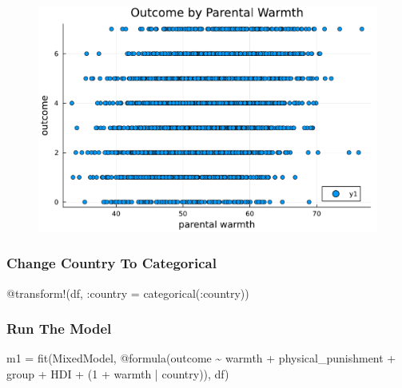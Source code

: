 \documentclass[
  letterpaper,
  DIV=11,
  numbers=noendperiod,
  oneside]{scrreprt}
\newenvironment{Shaded}{\begin{snugshade}}{\end{snugshade}}
\newcommand{\FloatTok}[1]{\textcolor[rgb]{0.68,0.00,0.00}{#1}}
\newcommand{\FunctionTok}[1]{\textcolor[rgb]{0.28,0.35,0.67}{#1}}
\newcommand{\NormalTok}[1]{\textcolor[rgb]{0.00,0.23,0.31}{#1}}
\newcommand{\OperatorTok}[1]{\textcolor[rgb]{0.37,0.37,0.37}{#1}}
\newcommand{\PreprocessorTok}[1]{\textcolor[rgb]{0.68,0.00,0.00}{#1}}
\begin{document}
\begin{figure}[H]

{\centering \includegraphics{index_files/figure-pdf/unnamed-chunk-14-J1.pdf}

}

\end{figure}

\hypertarget{change-country-to-categorical}{%
\subsubsection{Change Country To
Categorical}\label{change-country-to-categorical}}

\begin{Shaded}
\begin{Highlighting}[]
\PreprocessorTok{@transform}\NormalTok{!(df, }\OperatorTok{:}\NormalTok{country }\OperatorTok{=} \FunctionTok{categorical}\NormalTok{(}\OperatorTok{:}\NormalTok{country))}
\end{Highlighting}
\end{Shaded}

\hypertarget{run-the-model-2}{%
\subsubsection{Run The Model}\label{run-the-model-2}}

\begin{Shaded}
\begin{Highlighting}[]

\NormalTok{m1 }\OperatorTok{=} \FunctionTok{fit}\NormalTok{(MixedModel, }\PreprocessorTok{@formula}\NormalTok{(outcome }\OperatorTok{\textasciitilde{}}\NormalTok{ warmth }\OperatorTok{+}\NormalTok{ physical\_punishment }\OperatorTok{+} 
\NormalTok{               group }\OperatorTok{+}\NormalTok{ HDI }\OperatorTok{+}
\NormalTok{               (}\FloatTok{1} \OperatorTok{+}\NormalTok{ warmth }\OperatorTok{|}\NormalTok{ country)), df)}
\end{Highlighting}
\end{Shaded}
\end{document}
